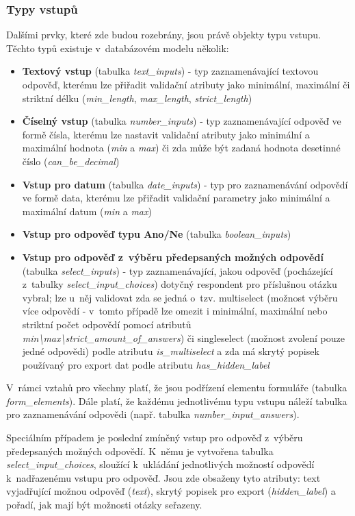 	\subsubsection{Typy vstupů}
	\label{sec:form_inputs_types}
	Dalšími prvky, které zde budou rozebrány, jsou právě objekty typu vstupu. Těchto typů existuje v~databázovém modelu několik:
	
	\begin{itemize}
		\item \textbf{Textový vstup} (tabulka \textit{text\_inputs}) - typ zaznamenávající textovou odpověď, kterému lze přiřadit validační atributy jako minimální, maximální či striktní délku (\textit{min\_length}, \textit{max\_length}, \textit{strict\_length})
		\item \textbf{Číselný vstup} (tabulka \textit{number\_inputs}) - typ zaznamenávající odpověď ve formě čísla, kterému lze nastavit validační atributy jako minimální a maximální hodnota (\textit{min} a \textit{max}) či zda může být zadaná hodnota desetinné číslo (\textit{can\_be\_decimal})
		\item \textbf{Vstup pro datum} (tabulka \textit{date\_inputs}) - typ pro zaznamenávání odpovědí ve formě data, kterému lze přiřadit validační parametry jako minimální a maximální datum (\textit{min} a \textit{max})
		\item \textbf{Vstup pro odpověď typu Ano/Ne} (tabulka \textit{boolean\_inputs})
		\item \textbf{Vstup pro odpověď z~výběru předepsaných možných odpovědí} (tabulka \textit{select\_inputs}) - typ zaznamenávající, jakou odpověď (pocházející z~tabulky \textit{select\_input\_choices}) dotyčný respondent pro příslušnou otázku vybral; lze u~něj validovat zda se jedná o~tzv. multiselect (možnost výběru více odpovědí - v~tomto případě lze omezit i minimální, maximální nebo striktní počet odpovědí pomocí atributů \textit{min\textbackslash max\textbackslash strict\_amount\_of\_answers}) či singleselect (možnost zvolení pouze jedné odpovědi) podle atributu \textit{is\_multiselect} a zda má skrytý popisek používaný pro export dat podle atributu \textit{has\_hidden\_label}
	\end{itemize}
	
	V~rámci vztahů pro všechny platí, že jsou podřízení elementu formuláře (tabulka \textit{form\_elements}). Dále platí, že každému jednotlivému typu vstupu náleží tabulka pro zaznamenávání odpovědi (např. tabulka \textit{number\_input\_answers}).
	
	Speciálním případem je poslední zmíněný vstup pro odpověď z~výběru předepsaných možných odpovědí. K~němu je vytvořena tabulka \textit{select\_input\_choices}, sloužící k~ukládání jednotlivých možností odpovědí k~nadřazenému vstupu pro odpověď. Jsou zde obsaženy tyto atributy: text vyjadřující možnou odpověď (\textit{text}), skrytý popisek pro export (\textit{hidden\_label}) a pořadí, jak mají být možnosti otázky seřazeny.
	
